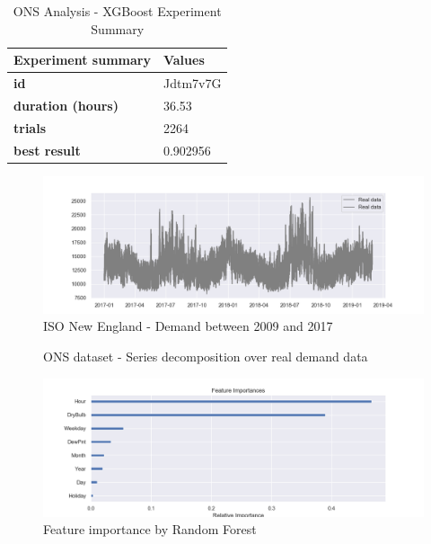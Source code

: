 \begin{table}[!htpb]
\small
\centering
\caption{ONS Analysis - XGBoost Experiment Summary}
\label{tab:XGBoostResultsONS}
\begin{tabular}{ll}
\hline
\textbf{Experiment summary} & \textbf{Values} \\ \hline
\textbf{id} & Jdtm7v7G \\
\textbf{duration (hours)} & 36.53 \\
\textbf{trials} & 2264 \\
\textbf{best result} & 0.902956 \\ \hline
\end{tabular}
\end{table}




\begin{figure}[!htpb]
\centering
\includegraphics[width=1.0\textwidth,height=\textheight,keepaspectratio]{Figures/Actual_Data.png}
\caption{ISO New England - Demand between 2009 and 2017}
\label{figDemand1}
\end{figure}


\begin{figure}[!htpb]
\centering

\caption{ONS dataset - Series decomposition over real demand data}
\label{figSeasonD2}
\end{figure}



\begin{figure}[!htpb]
\centering
\includegraphics[width=1.0\textwidth,height=\textheight,keepaspectratio]{Figures/Feature_Importance_RF.png}
\caption{Feature importance by Random Forest}
\label{figFeatImp1}
\end{figure}


